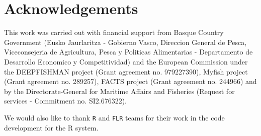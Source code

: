 
\section{Acknowledgements}

  This work was carried out with financial support from Basque Country Government (Eusko Jaurlaritza - Gobierno Vasco, Direccion General de Pesca, 
  Viceconsejeria de Agricultura, Pesca y Politicas Alimentarias - Departamento de Desarrollo Economico y Competitividad) 
  and the European Commission under the DEEPFISHMAN project (Grant agreement no. 979227390), Myfish project (Grant agreement no. 289257), 
  FACTS project (Grant agreement no. 244966) and by the Directorate-General for Maritime Affairs and Fisheries (Request for services - Commitment no. SI2.676322).

  We would also like to thank \texttt{R} and \texttt{FLR} teams for their work in the code development for the R system.
